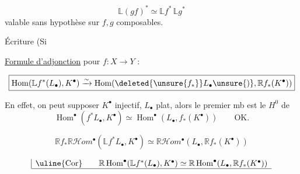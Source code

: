 \[
\mathbb L(gf)^* \simeq \mathbb L f^*\,\mathbb L g^*
\]
valable sans hypothèse sur $f,g$ composables.

Écriture  (Si

\uline{Formule d'adjonction} pour $f:X\longrightarrow Y$ :

\[
\boxed{\operatorname{Hom}(\mathbb L f^*(L_\bullet),K^\bullet)\xrightarrow{\sim}
\operatorname{Hom}(\deleted{\unsure{f_*}}L_\bullet\unsure{)},\mathbb R f_*(K^\bullet))}
\]

En effet, on peut supposer $K^\bullet$  injectif, $L_\bullet$ plat, alors le premier mb est  le $H^0$ de
\[
\operatorname{Hom}^\bullet(f^*L_\bullet,K^\bullet)\simeq
\operatorname{Hom}^\bullet(L_\bullet,f_*(K^\bullet))\qquad \text{OK.}
\]

\[
\mathbb R f_*\mathbb R\mathscr H\!om^\bullet(\mathbb L f^*L_\bullet,K^\bullet)
\simeq\mathbb R\mathscr H\!om^\bullet(L_\bullet,\mathbb R f_*(K^\bullet))
\]

\[
\begin{array}{|l}
\text{\uline{Cor}}\qquad \mathbb R\operatorname{Hom}^\bullet(\mathbb L f^*(L_\bullet),K^\bullet)\simeq
\mathbb R\operatorname{Hom}^\bullet(L_\bullet,\mathbb R f_*(K^\bullet))\\\hline
\end{array}
\]

